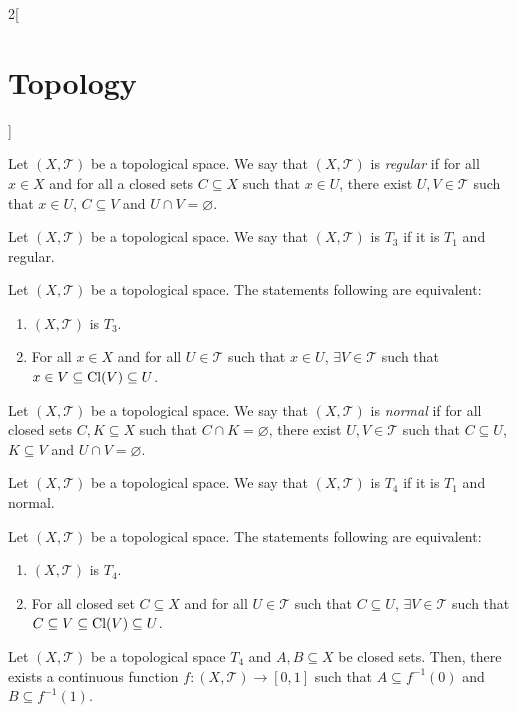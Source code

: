\documentclass[../../../main.tex]{subfiles}
\begin{document}
\begin{multicols}{2}[\section{Topology}]
\begin{theorem}
  \end{theorem}
  \begin{definition}
    Let $(X,\mathcal{T})$ be a topological space. We say that $(X,\mathcal{T})$ is \textit{regular} if for all $x\in X$ and for all a closed sets $C\subseteq X$ such that $x\in U$, there exist $U,V\in\mathcal{T}$ such that $x\in U$, $C\subseteq V$ and $U\cap V=\varnothing$.
  \end{definition}
  \begin{definition}[$T_3$ space]
    Let $(X,\mathcal{T})$ be a topological space. We say that $(X,\mathcal{T})$ is $T_3$ if it is $T_1$ and regular.
  \end{definition}
  \begin{theorem}
    Let $(X,\mathcal{T})$ be a topological space. The statements following are equivalent:
    \begin{enumerate}
      \item $(X,\mathcal{T})$ is $T_3$.
      \item For all $x\in X$ and for all $U\in\mathcal{T}$ such that $x\in U$, $\exists V\in\mathcal{T}$ such that $x\in V\subseteq\operatorname{Cl}(V)\subseteq U$.
    \end{enumerate}
  \end{theorem}
  \begin{definition}
    Let $(X,\mathcal{T})$ be a topological space. We say that $(X,\mathcal{T})$ is \textit{normal} if for all closed sets $C,K\subseteq X$ such that $C\cap K=\varnothing$, there exist $U,V\in\mathcal{T}$ such that $C\subseteq U$, $K\subseteq V$ and $U\cap V=\varnothing$.
  \end{definition}
  \begin{definition}[$T_4$ space]
    Let $(X,\mathcal{T})$ be a topological space. We say that $(X,\mathcal{T})$ is $T_4$ if it is $T_1$ and normal.
  \end{definition}
  \begin{theorem}
    Let $(X,\mathcal{T})$ be a topological space. The statements following are equivalent:
    \begin{enumerate}
      \item $(X,\mathcal{T})$ is $T_4$.
      \item For all closed set $C\subseteq X$ and for all $U\in\mathcal{T}$ such that $C\subseteq U$, $\exists V\in\mathcal{T}$ such that $C\subseteq V\subseteq\operatorname{Cl}(V)\subseteq U$.
    \end{enumerate}
  \end{theorem}
  \begin{lemma}
    Let $(X,\mathcal{T})$ be a topological space $T_4$ and $A,B\subseteq X$ be closed sets. Then, there exists a continuous function $f:(X,\mathcal{T})\rightarrow[0,1]$ such that $A\subseteq f^{-1}(0)$ and $B\subseteq f^{-1}(1)$.
  \end{lemma}
\end{multicols}
\end{document}
